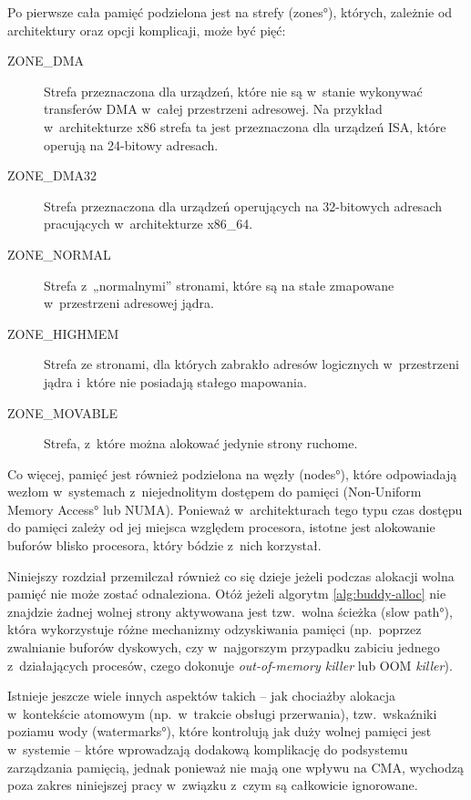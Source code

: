 Po pierwsze cała pamięć podzielona jest na strefy (\ang{zones}),
których, zależnie od architektury oraz opcji komplicaji, może być
pięć:

\begin{description}
\item[ZONE\_DMA] Strefa przeznaczona dla urządzeń, które nie są
  w~stanie wykonywać transferów DMA w~całej przestrzeni adresowej.  Na
  przykład w~architekturze x86 strefa ta jest przeznaczona dla
  urządzeń ISA, które operują na 24-bitowy adresach.
\item[ZONE\_DMA32] Strefa przeznaczona dla urządzeń operujących
  na 32-bitowych adresach pracujących w~architekturze x86\_64.
\item[ZONE\_NORMAL] Strefa z~„normalnymi” stronami, które są na
  stałe zmapowane w~przestrzeni adresowej jądra.
\item[ZONE\_HIGHMEM] Strefa ze stronami, dla których zabrakło
  adresów logicznych w~przestrzeni jądra i~które nie posiadają stałego
  mapowania.
\item[ZONE\_MOVABLE] Strefa, z~które można alokować jedynie
  strony ruchome.
\end{description}

Co więcej, pamięć jest również podzielona na węzły (\ang{nodes}),
które odpowiadają wezłom w~systemach z~niejednolitym dostępem do
pamięci (\ang{Non-Uniform Memory Access} lub NUMA).  Ponieważ
w~architekturach tego typu czas dostępu do pamięci zależy od jej
miejsca względem procesora, istotne jest alokowanie buforów blisko
procesora, który bódzie z~nich korzystał.

Niniejszy rozdział przemilczał również co się dzieje jeżeli podczas
alokacji wolna pamięć nie może zostać odnaleziona.  Otóż jeżeli
algorytm \ref{alg:buddy-alloc} nie znajdzie żadnej wolnej strony
aktywowana jest tzw.\ wolna ścieżka (\ang{slow path}), która
wykorzystuje różne mechanizmy odzyskiwania pamięci (np.\ poprzez
zwalnianie buforów dyskowych, czy w~najgorszym przypadku zabiciu
jednego z~działających procesów, czego dokonuje {\it out-of-memory
  killer} lub OOM {\it killer}).

Istnieje jeszcze wiele innych aspektów takich -- jak chociażby
alokacja w~kontekście atomowym (np.\ w~trakcie obsługi przerwania),
tzw.\ wskaźniki poziamu wody (\ang{watermarks}), które kontrolują jak
duży wolnej pamięci jest w~systemie -- które wprowadzają dodakową
komplikację do podsystemu zarządzania pamięcią, jednak ponieważ nie
mają one wpływu na CMA, wychodzą poza zakres niniejszej pracy
w~związku z~czym są całkowicie ignorowane.
